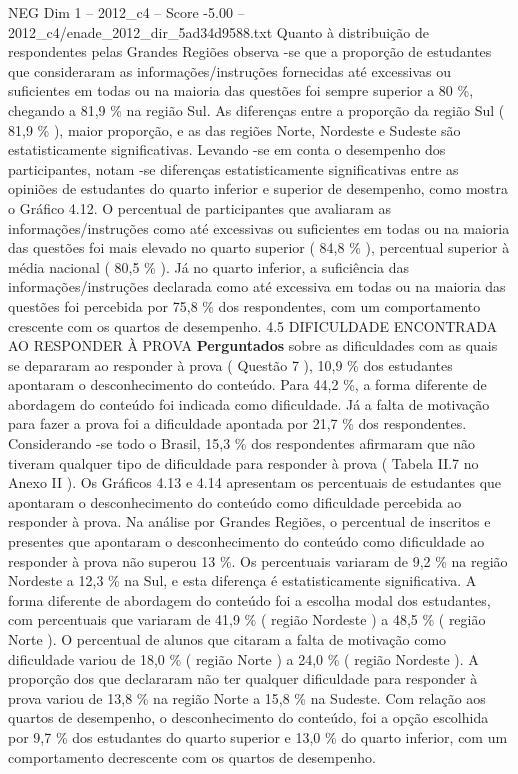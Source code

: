 \begin{textsample}{NEG Dim 1 – 2012\_c4 – Score -5.00 – 2012\_c4/enade\_2012\_dir\_5ad34d9588.txt}
Quanto à distribuição de respondentes pelas Grandes Regiões observa -se que a proporção de estudantes que consideraram as informações/instruções fornecidas até excessivas ou suficientes em todas ou na maioria das questões foi sempre superior a 80 \%, chegando a 81,9 \% na região Sul.
As diferenças entre a proporção da região Sul ( 81,9 \% ), maior proporção, e as das regiões Norte, Nordeste e Sudeste são estatisticamente significativas.
Levando -se em conta o desempenho dos participantes, notam -se diferenças estatisticamente significativas entre as opiniões de estudantes do quarto inferior e superior de desempenho, como mostra o Gráfico 4.12.
O percentual de participantes que avaliaram as informações/instruções como até excessivas ou suficientes em todas ou na maioria das questões foi mais elevado no quarto superior ( 84,8 \% ), percentual superior à média nacional ( 80,5 \% ).
Já no quarto inferior, a suficiência das informações/instruções declarada como até excessiva em todas ou na maioria das questões foi percebida por 75,8 \% dos respondentes, com um comportamento crescente com os quartos de desempenho. 4.5 DIFICULDADE ENCONTRADA AO RESPONDER À PROVA \textbf{Perguntados} sobre as dificuldades com as quais se depararam ao responder à prova ( Questão 7 ), 10,9 \% dos estudantes apontaram o desconhecimento do conteúdo.
Para 44,2 \%, a forma diferente de abordagem do conteúdo foi indicada como dificuldade.
Já a falta de motivação para fazer a prova foi a dificuldade apontada por 21,7 \% dos respondentes.
Considerando -se todo o Brasil, 15,3 \% dos respondentes afirmaram que não tiveram qualquer tipo de dificuldade para responder à prova ( Tabela II.7 no Anexo II ).
Os Gráficos 4.13 e 4.14 apresentam os percentuais de estudantes que apontaram o desconhecimento do conteúdo como dificuldade percebida ao responder à prova.
Na análise por Grandes Regiões, o percentual de inscritos e presentes que apontaram o desconhecimento do conteúdo como dificuldade ao responder à prova não superou 13 \%.
Os percentuais variaram de 9,2 \% na região Nordeste a 12,3 \% na Sul, e esta diferença é estatisticamente significativa.
A forma diferente de abordagem do conteúdo foi a escolha modal dos estudantes, com percentuais que variaram de 41,9 \% ( região Nordeste ) a 48,5 \% ( região Norte ).
O percentual de alunos que citaram a falta de motivação como dificuldade variou de 18,0 \% ( região Norte ) a 24,0 \% ( região Nordeste ).
A proporção dos que declararam não ter qualquer dificuldade para responder à prova variou de 13,8 \% na região Norte a 15,8 \% na Sudeste.
Com relação aos quartos de desempenho, o desconhecimento do conteúdo, foi a opção escolhida por 9,7 \% dos estudantes do quarto superior e 13,0 \% do quarto inferior, com um comportamento decrescente com os quartos de desempenho.

\end{textsample}
